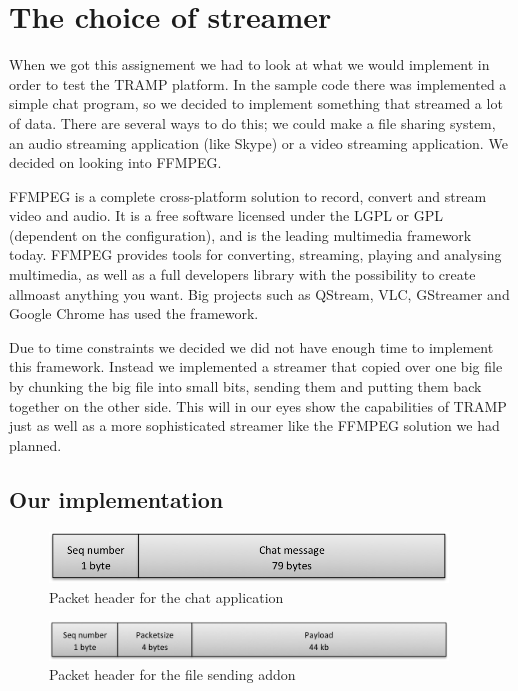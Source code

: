 
\section{The choice of streamer}
\label{sec:streamer}
When we got this assignement we had to look at what we would implement in order to test the TRAMP platform. In the sample code there was implemented a simple chat program, so we decided to implement something that streamed a lot of data. There are several ways to do this; we could make a file sharing system, an audio streaming application (like Skype) or a video streaming application. We decided on looking into FFMPEG.

FFMPEG is a complete cross-platform solution to record, convert and stream video and audio. It is a free software licensed under the LGPL or GPL (dependent on the configuration), and is the leading multimedia framework today.\cite{FFMPEG-homepage}
FFMPEG provides tools for converting, streaming, playing and analysing multimedia, as well as a full developers library with the possibility to create allmoast anything you want. Big projects such as QStream, VLC, GStreamer and Google Chrome has used the framework.

Due to time constraints we decided we did not have enough time to implement this framework. Instead we implemented a streamer that copied over one big file by chunking the big file into small bits, sending them and putting them back together on the other side. This will in our eyes show the capabilities of TRAMP just as well as a more sophisticated streamer like the FFMPEG solution we had planned.

\subsection{Our implementation}

\begin{figure}[ht!]
\centering
 \includegraphics[width=300pt]{sendchatpkt.png}
\caption{Packet header for the chat application}
\label{Figure:Packet_header_chat}
\end{figure}


\begin{figure}[ht!]
\centering
 \includegraphics[width=300pt]{sendpkt.png}
\caption{Packet header for the file sending addon}
\end{figure}

